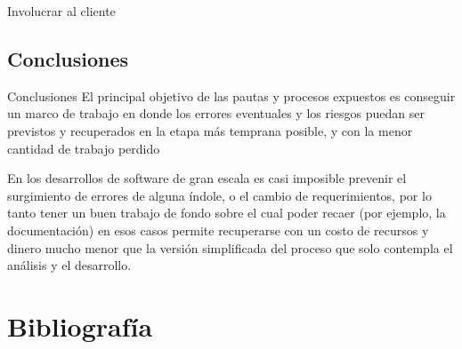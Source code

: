 \documentclass{beamer}
\begin{document}
\begin{frame}{Involucrar al cliente}

\end{frame}

\subsection{Conclusiones}
\begin{frame}{Conclusiones}
El principal objetivo de las pautas y procesos expuestos es conseguir un marco de trabajo en donde los errores eventuales y los riesgos puedan ser previstos y recuperados en la etapa más temprana posible, y con la menor cantidad de trabajo perdido

\vspace{1em}

En los desarrollos de software de gran escala es casi imposible prevenir el surgimiento de errores de alguna índole, o el cambio de requerimientos, por lo tanto tener un buen trabajo de fondo sobre el cual poder recaer (por ejemplo, la documentación) en esos casos permite recuperarse con un costo de recursos y dinero mucho menor que la versión simplificada del proceso que solo contempla el análisis y el desarrollo.
\end{frame}


\section{Bibliografía}
\end{document}
